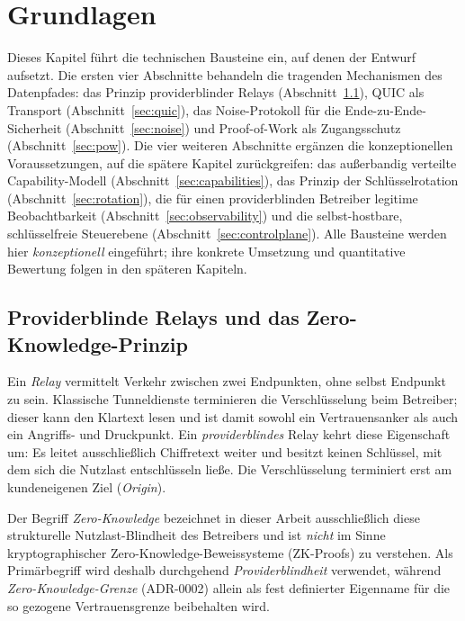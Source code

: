 \chapter{Grundlagen}
\label{ch:grundlagen}

Dieses Kapitel führt die technischen Bausteine ein, auf denen der Entwurf
aufsetzt. Die ersten vier Abschnitte behandeln die tragenden Mechanismen des
Datenpfades: das Prinzip providerblinder Relays
(Abschnitt~\ref{sec:providerblind}), QUIC als Transport
(Abschnitt~\ref{sec:quic}), das Noise-Protokoll für die Ende-zu-Ende-Sicherheit
(Abschnitt~\ref{sec:noise}) und Proof-of-Work als Zugangsschutz
(Abschnitt~\ref{sec:pow}). Die vier weiteren Abschnitte ergänzen die
konzeptionellen Voraussetzungen, auf die spätere Kapitel zurückgreifen: das
außerbandig verteilte Capability-Modell (Abschnitt~\ref{sec:capabilities}), das
Prinzip der Schlüsselrotation (Abschnitt~\ref{sec:rotation}), die für einen
providerblinden Betreiber legitime Beobachtbarkeit
(Abschnitt~\ref{sec:observability}) und die selbst-hostbare, schlüsselfreie
Steuerebene (Abschnitt~\ref{sec:controlplane}). Alle Bausteine werden hier
\emph{konzeptionell} eingeführt; ihre konkrete Umsetzung und quantitative
Bewertung folgen in den späteren Kapiteln.

\section{Providerblinde Relays und das Zero-Knowledge-Prinzip}
\label{sec:providerblind}

Ein \emph{Relay} vermittelt Verkehr zwischen zwei Endpunkten, ohne selbst
Endpunkt zu sein. Klassische Tunneldienste terminieren die Verschlüsselung beim
Betreiber; dieser kann den Klartext lesen und ist damit sowohl ein
Vertrauensanker als auch ein Angriffs- und Druckpunkt. Ein \emph{providerblindes}
Relay kehrt diese Eigenschaft um: Es leitet ausschließlich Chiffretext weiter und
besitzt keinen Schlüssel, mit dem sich die Nutzlast entschlüsseln ließe. Die
Verschlüsselung terminiert erst am kundeneigenen Ziel (\emph{Origin}).

Der Begriff \emph{Zero-Knowledge} bezeichnet in dieser Arbeit ausschließlich diese
strukturelle Nutzlast-Blindheit des Betreibers und ist \emph{nicht} im Sinne
kryptographischer Zero-Knowledge-Beweissysteme (ZK-Proofs) zu verstehen. Als
Primärbegriff wird deshalb durchgehend \emph{Providerblindheit} verwendet, während
\emph{Zero-Knowledge-Grenze} (ADR-0002) allein als fest definierter Eigenname für
die so gezogene Vertrauensgrenze beibehalten wird.

